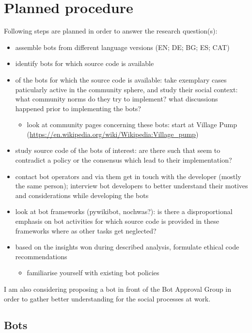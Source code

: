 \documentclass[pdftex,a4paper,11pt]{scrartcl}
\begin{document}
\section{Planned procedure}

Following steps are planned in order to answer the research question(s):

\begin{itemize}
    \item assemble bots from different language versions (EN; DE; BG; ES; CAT)
    \item identify bots for which source code is available
    \item of the bots for which the source code is available: take exemplary cases paticularly active in the community sphere, and study their social context: what community norms do they try to implement? what discussions happened prior to implementing the bots?
    \begin{itemize}
        \item look at community pages concerning these bots: start at Village Pump (\url{https://en.wikipedia.org/wiki/Wikipedia:Village_pump})
    \end{itemize}
    \item study source code of the bots of interest: are there such that seem to contradict a policy or the consensus which lead to their implementation?
    \item contact bot operators and via them get in touch with the developer (mostly the same person); interview bot developers to better understand their motives and considerations while developing the bots
    \item look at bot frameworks (pywikibot, nochwas?): is there a disproportional emphasis on bot activities for which source code is provided in these frameworks where as other tasks get neglected?
    \item based on the insights won during described analysis, formulate ethical code recommendations
    \begin{itemize}
        \item familiarise yourself with existing bot policies
    \end{itemize}
\end{itemize}

I am also considering proposing a bot in front of the Bot Approval Group in order to gather better understanding for the social processes at work.

\subsection{Bots}
\end{document}
